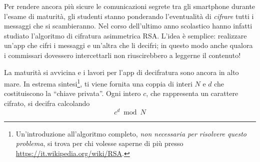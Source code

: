 \usepackage{xcolor}
\usepackage{afterpage}
\usepackage{pifont,mdframed}
\usepackage[bottom]{footmisc}
\usepackage{amsthm}
\newtheorem*{lemma}{Lemma}
\newtheorem*{teo}{Teorema}

\newcommand{\inputfile}{\texttt{input.txt}}
\newcommand{\outputfile}{\texttt{output.txt}}

\newenvironment{warning}
  {\par\begin{mdframed}[linewidth=2pt,linecolor=gray]%
    \begin{list}{}{\leftmargin=1cm
                    \labelwidth=\leftmargin}\item[\Large\ding{43}]}
  {\end{list}\end{mdframed}\par}

\newcommand{\funcitem}[2]{\item[$\blacksquare$] \textbf{\large \textsf{Funzione} \texttt{#1}} \vspace{-0.3cm} \begin{center}\begin{tabularx}{\textwidth}{|c|X|} \hline #2 \hline \end{tabularx}\end{center}}


    Per rendere ancora più sicure le comunicazioni segrete tra gli smartphone durante l'esame di maturità, gli studenti stanno ponderando l'eventualità di \emph{cifrare} tutti i messaggi che si scambieranno. Nel corso dell'ultimo anno scolastico hanno infatti studiato l'algoritmo di cifratura asimmetrica RSA. L'idea è semplice: realizzare un'app che cifri i messaggi e un'altra che li decifri; in questo modo anche qualora i commissari dovessero intercettarli non riuscirebbero a leggerne il contenuto!

      La maturità si avvicina e i lavori per l'app di decifratura sono ancora in alto mare. In estrema sintesi\footnote{Un'introduzione all'algoritmo completo, \emph{non necessaria per risolvere questo problema}, si trova per chi volesse saperne di più presso \url{https://it.wikipedia.org/wiki/RSA}.}, ti viene fornita una coppia di interi $N$ e $d$ che costituiscono la ``chiave privata''. Ogni intero $c$, che rappresenta un carattere cifrato, si decifra calcolando $$c^d \bmod N$$

